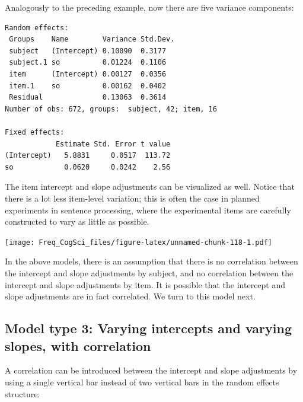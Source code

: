 \documentclass[12pt,]{krantz}
\newenvironment{Shaded}{\begin{snugshade}}{\end{snugshade}}
\newcommand{\DataTypeTok}[1]{\textcolor[rgb]{0.13,0.29,0.53}{#1}}
\newcommand{\KeywordTok}[1]{\textcolor[rgb]{0.13,0.29,0.53}{\textbf{#1}}}
\newcommand{\NormalTok}[1]{#1}
\newcommand{\OperatorTok}[1]{\textcolor[rgb]{0.81,0.36,0.00}{\textbf{#1}}}
\newcommand{\OtherTok}[1]{\textcolor[rgb]{0.56,0.35,0.01}{#1}}
\begin{document}
Analogously to the preceding example, now there are five variance components:

\begin{verbatim}
Random effects:
 Groups    Name        Variance Std.Dev.
 subject   (Intercept) 0.10090  0.3177  
 subject.1 so          0.01224  0.1106  
 item      (Intercept) 0.00127  0.0356  
 item.1    so          0.00162  0.0402  
 Residual              0.13063  0.3614  
Number of obs: 672, groups:  subject, 42; item, 16

Fixed effects:
            Estimate Std. Error t value
(Intercept)   5.8831     0.0517  113.72
so            0.0620     0.0242    2.56
\end{verbatim}

The item intercept and slope adjustments can be visualized as well. Notice that there is a lot less item-level variation; this is often the case in planned experiments in sentence processing, where the experimental items are carefully constructed to vary as little as possible.

\begin{Shaded}
\end{Shaded}

\texttt{[image: Freq\_CogSci\_files/figure-latex/unnamed-chunk-118-1.pdf]}

In the above models, there is an assumption that there is no correlation between the intercept and slope adjustments by subject, and no correlation between the intercept and slope adjustments by item. It is possible that the intercept and slope adjustments are in fact correlated. We turn to this model next.

\hypertarget{model-type-3-varying-intercepts-and-varying-slopes-with-correlation}{%
\subsection{Model type 3: Varying intercepts and varying slopes, with correlation}\label{model-type-3-varying-intercepts-and-varying-slopes-with-correlation}}

A correlation can be introduced between the intercept and slope adjustments by using a single vertical bar instead of two vertical bars in the random effects structure:
\end{document}

